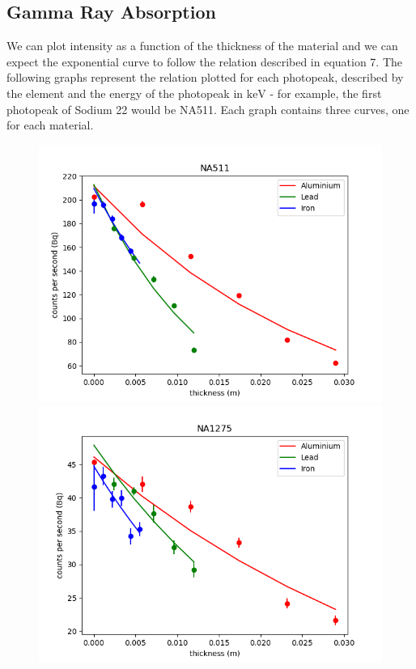 \documentclass[11pt]{article} %
\begin{document}
    \subsection{Gamma Ray Absorption}
        We can plot intensity as a function of the thickness of the material and we can expect the exponential curve to follow the relation described in equation 7. The following graphs represent the relation plotted for each photopeak, described by the element and the energy of the photopeak in $\unit{\keV}$ - for example, the first photopeak of Sodium 22 would be NA511. Each graph contains three curves, one for each material.
        \begin{figure}[H] \centering \label{exponentials}
            \includegraphics[scale=0.4]{assets/NA511.png}
            \includegraphics[scale=0.4]{assets/NA1275.png}

\end{figure}
\end{document}
